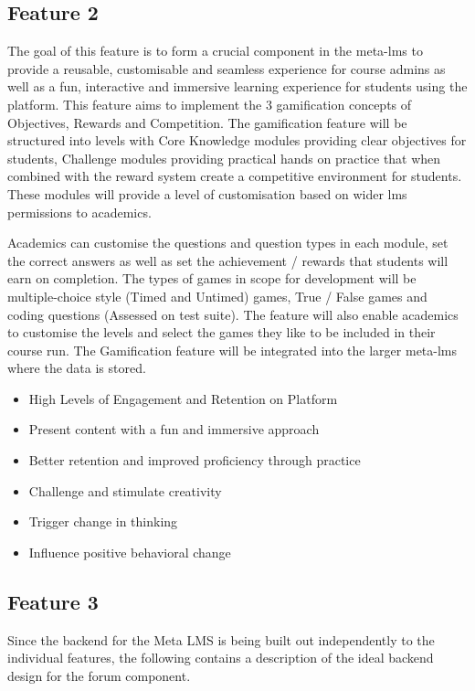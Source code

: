 \newpage

\subsection{Feature 2}
The goal of this feature is to form a crucial component in the meta-lms to provide a reusable, customisable and seamless experience for course admins as well as a fun, interactive and immersive learning experience for students using the platform. This feature aims to implement the 3 gamification concepts of Objectives, Rewards and Competition. 
The gamification feature will be structured into levels with Core Knowledge modules providing clear objectives for students, Challenge modules providing practical hands on practice that when combined with the reward system create a competitive environment for students. These modules will provide a level of customisation based on wider lms permissions to academics. 
\newline

Academics can customise the questions and question types in each module, set the correct answers as well as set the achievement / rewards that students will earn on completion.
The types of games in scope for development will be multiple-choice style (Timed and Untimed) games, True / False games and coding questions (Assessed on test suite). The feature will also enable academics to customise the levels and select the games they like to be included in their course run. The Gamification feature will be integrated into the larger meta-lms where the data is stored.

\begin{itemize}
    \item High Levels of Engagement and Retention on Platform
    \item Present content with a fun and immersive approach
    \item Better retention and improved proficiency through practice
    \item Challenge and stimulate creativity
    \item Trigger change in thinking
    \item Influence positive behavioral change
\end{itemize}

\newpage


\subsection{Feature 3}
Since the backend for the Meta LMS is being built out independently to the individual features, the following contains a description of the ideal backend design for the forum component.

